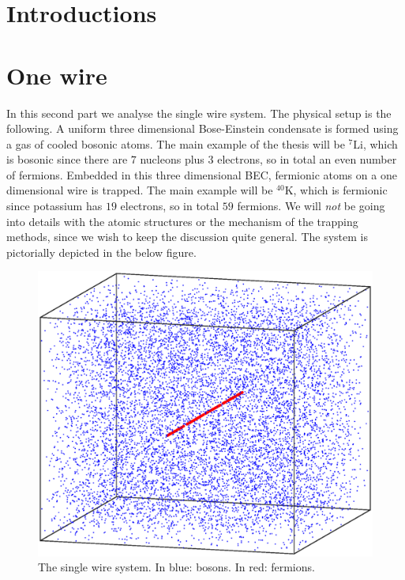 \documentclass[11pt, twoside]{Thesis} %
\begin{document}
{\mainmatter %

\pagestyle{fancy} %



\part{Introductions}
\newpage


 

\part{One wire}
In this second part we analyse the single wire system. The physical setup is the following. A uniform three dimensional Bose-Einstein condensate is formed using a gas of cooled bosonic atoms. The main example of the thesis will be $^{7}\text{Li}$, which is bosonic since there are $7$ nucleons plus $3$ electrons, so in total an even number of fermions. Embedded in this three dimensional BEC, fermionic atoms on a one dimensional wire is trapped. The main example will be $^{40}\text{K}$, which is fermionic since potassium has $19$ electrons, so in total $59$ fermions. We will \textit{not} be going into details with the atomic structures or the mechanism of the trapping methods, since we wish to keep the discussion quite general. The system is pictorially depicted in the below figure.

\vspace{2.5cm}

\begin{figure}[H]
\center
\includegraphics[width=0.8\columnwidth]{gasand1wire.eps}
\\ The single wire system. In blue: bosons. In red: fermions.   
\end{figure}

}
\end{document}
